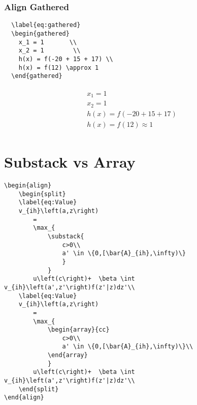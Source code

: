 \documentclass[12pt,english]{article}
\begin{document}
\subsubsection{Align Gathered}
\begin{verbatim}
  \label{eq:gathered}
  \begin{gathered}
    x_1 = 1       \\
    x_2 = 1        \\
    h(x) = f(-20 + 15 + 17) \\
    h(x) = f(12) \approx 1
  \end{gathered}
\end{verbatim}
\begin{align}
  \label{eq:gathered}
  \begin{gathered}
    x_1 = 1       \\
    x_2 = 1        \\
    h(x) = f(-20 + 15 + 17) \\
    h(x) = f(12) \approx 1
  \end{gathered}
\end{align}

\pagebreak
\section{Substack vs Array}
\begin{verbatim}
\begin{align}
    \begin{split}
    \label{eq:Value}
    v_{ih}\left(a,z\right)
        =
        \max_{
            \substack{
                c>0\\
                a' \in \{0,[\bar{A}_{ih},\infty)\}
                }
            }
        u\left(c\right)+  \beta \int v_{ih}\left(a',z'\right)f(z'|z)dz'\\
    \label{eq:Value}
    v_{ih}\left(a,z\right)
        =
        \max_{
            \begin{array}{cc}
                c>0\\
                a' \in \{0,[\bar{A}_{ih},\infty)\}\\
            \end{array}
            }
        u\left(c\right)+  \beta \int v_{ih}\left(a',z'\right)f(z'|z)dz'\\
    \end{split}
\end{align}
\end{verbatim}
\end{document}
